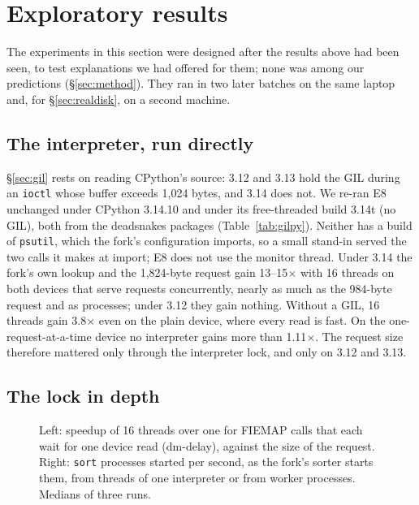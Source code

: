 \section{Exploratory results}
\label{sec:explore}

The experiments in this section were designed after the results above had been seen,
to test explanations we had offered for them; none was among our predictions
(\S\ref{sec:method}). They ran in two later batches on the same laptop and, for
\S\ref{sec:realdisk}, on a second machine.

\subsection{The interpreter, run directly}
\label{sec:gilpy}

\S\ref{sec:gil} rests on reading CPython's source: 3.12 and 3.13 hold the GIL during
an \texttt{ioctl} whose buffer exceeds 1{,}024 bytes, and 3.14 does not. We re-ran E8
unchanged under CPython 3.14.10 and under its free-threaded build 3.14t (no GIL), both
from the deadsnakes packages (Table~\ref{tab:gilpy}). Neither has a build of
\texttt{psutil}, which the fork's configuration imports, so a small stand-in served
the two calls it makes at import; E8 does not use the monitor thread. Under 3.14 the fork's own lookup
and the 1{,}824-byte request gain 13--15$\times$ with 16 threads on both devices that
serve requests concurrently, nearly as much as the 984-byte request and as processes;
under 3.12 they gain nothing. Without a GIL, 16 threads gain 3.8$\times$ even on the
plain device, where every read is fast. On the one-request-at-a-time device no interpreter gains more
than 1.11$\times$. The request size therefore mattered only through the interpreter
lock, and only on 3.12 and 3.13.

\begin{table}[t]
\caption{E8 under three interpreters: speedup of 16 workers over one for FIEMAP calls
that each wait for one device read (medians of five passes).}
\label{tab:gilpy}
\small
{}
\end{table}

\subsection{The lock in depth}
\label{sec:gildepth}

\begin{figure}[t]
\centering
{}\hfill
{}
\caption{Left: speedup of 16 threads over one for FIEMAP calls that each wait for one
device read (dm-delay), against the size of the request. Right: \texttt{sort} processes
started per second, as the fork's sorter starts them, from threads of one interpreter or
from worker processes. Medians of three runs.}
\label{fig:gildepth}
\end{figure}

